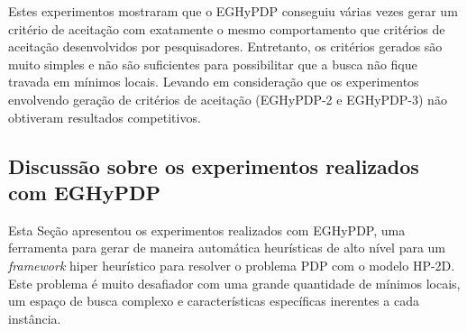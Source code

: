 	Estes experimentos mostraram que o EGHyPDP conseguiu várias vezes gerar um critério de aceitação com exatamente o mesmo comportamento que critérios de aceitação desenvolvidos por pesquisadores. Entretanto, os critérios gerados são muito simples e não são suficientes para possibilitar que a busca não fique travada em mínimos locais. Levando em consideração que os experimentos envolvendo geração de critérios de aceitação (EGHyPDP-2 e EGHyPDP-3) não obtiveram resultados competitivos. 
	
	
	\subsection{Discussão sobre os experimentos realizados com EGHyPDP}
	
	Esta Seção apresentou os experimentos realizados com EGHyPDP, uma ferramenta para gerar de maneira automática heurísticas de alto nível para um \textit{framework} hiper heurístico para resolver o problema PDP com o modelo HP-2D. Este problema é muito desafiador com uma grande quantidade de mínimos locais, um espaço de busca complexo e características específicas inerentes a cada instância. 
	
